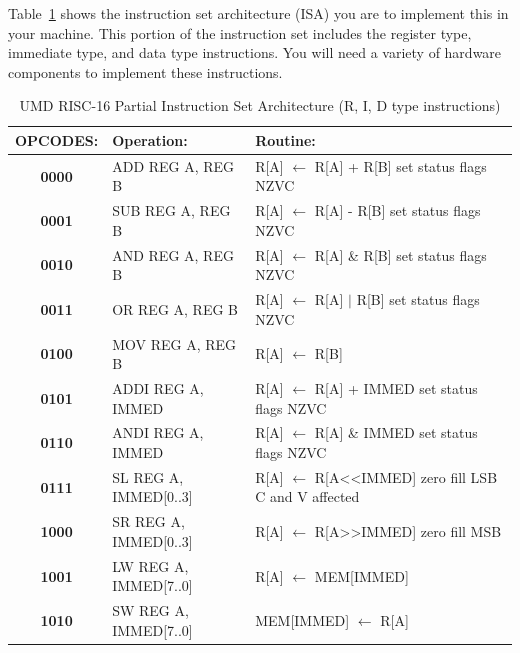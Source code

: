 \documentclass{article}
\begin{document}
Table~\ref{tab:riscise} shows the instruction set architecture (ISA) you are to implement this in your machine. This portion of the instruction set includes the register type, immediate type, and data type instructions. You will need a variety of hardware components to implement these instructions.

\begin{table}[!htbp]
  \begin{center}
    \begin{tabular}{|c|l|l|}
       \hline
       \rowcolor{gray!50}
       \large{\textbf{OPCODES:}} & \large{\textbf{Operation:}} & \large{\textbf{Routine:}} \\
       \hline 
       \textbf{0000} & ADD  REG A, REG B & R[A] $\leftarrow$ R[A] + R[B] set status flags NZVC  \\
       \textbf{0001} & SUB  REG A, REG B & R[A] $\leftarrow$ R[A] - R[B] set status flags NZVC  \\
       \textbf{0010} & AND  REG A, REG B & R[A] $\leftarrow$ R[A] \& R[B] set status flags NZVC  \\
       \textbf{0011} & OR   REG A, REG B & R[A] $\leftarrow$ R[A] $\mid$ R[B] set status flags NZVC  \\
       \textbf{0100} & MOV  REG A, REG B & R[A] $\leftarrow$ R[B] \\
       \textbf{0101} & ADDI REG A, IMMED & R[A] $\leftarrow$ R[A] + IMMED set status flags NZVC  \\
       \textbf{0110} & ANDI REG A, IMMED & R[A] $\leftarrow$ R[A] \& IMMED set status flags NZVC  \\
       \textbf{0111} & SL   REG A, IMMED[0..3] & R[A] $\leftarrow$  R[A\textless \textless IMMED] zero fill LSB C and V affected  \\
       \textbf{1000} & SR   REG A, IMMED[0..3] & R[A] $\leftarrow$ R[A\textgreater \textgreater IMMED] zero fill MSB  \\
       \textbf{1001} & LW   REG A, IMMED[7..0] & R[A] $\leftarrow$ MEM[IMMED]  \\
       \textbf{1010} & SW   REG A, IMMED[7..0] & MEM[IMMED] $\leftarrow$ R[A]  \\
       \hline
    \end{tabular}
  \end{center}
  \caption{UMD RISC-16 Partial Instruction Set Architecture (R, I, D type instructions)}
  \label{tab:riscise}
\end{table}
\FloatBarrier
\end{document}
